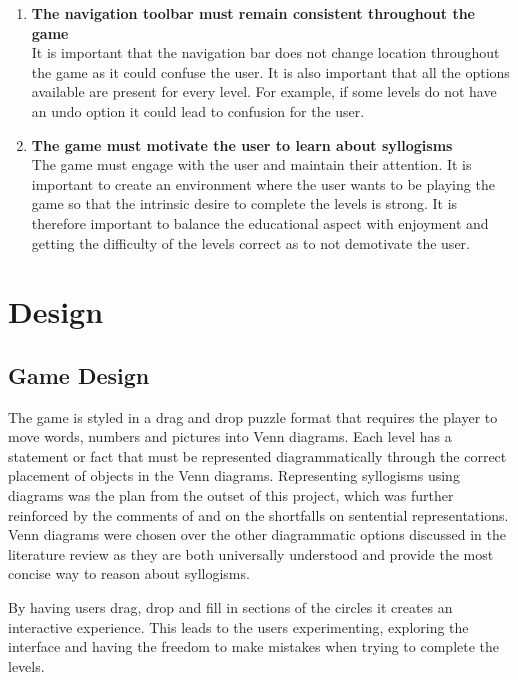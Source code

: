 \documentclass[12pt,a4paper]{report}
\begin{document}
\begin{enumerate}[label*=\arabic*]
            

             
             \item \textbf{The navigation toolbar must remain consistent throughout the game                                   }\\
It is important that the navigation bar does not change location throughout the game as it could confuse the user. It is also important that all the options available are present for every level. For example, if some levels do not have an undo option it could lead to confusion for the user.

                                      \item \textbf{The game must motivate the user to learn about syllogisms
}\\
The game must engage with the user and maintain their attention. It is important to create an environment where the user wants to be playing the game so that the intrinsic desire to complete the levels is strong. It is therefore important to balance the educational aspect with enjoyment and getting the difficulty of the levels correct as to not demotivate the user.
            \end{enumerate}
            
\chapter{Design}


\section{Game Design}
The game is styled in a drag and drop puzzle format that requires the player to move words, numbers and pictures into Venn diagrams. Each level has a statement or fact that must be represented diagrammatically through the correct placement of objects in the Venn diagrams. Representing syllogisms using diagrams was the plan from the outset of this project, which was further reinforced by the comments of \cite{larkin1987diagram} and \cite{johnson1980mental} on the shortfalls on sentential representations. Venn diagrams were chosen over the other diagrammatic options discussed in the literature review as they are both universally understood and provide the most concise way to reason about syllogisms. 

By having users drag, drop and fill in sections of the circles it creates an interactive experience. This leads to the users experimenting, exploring the interface and having the freedom to make mistakes when trying to complete the levels.
\end{document}
